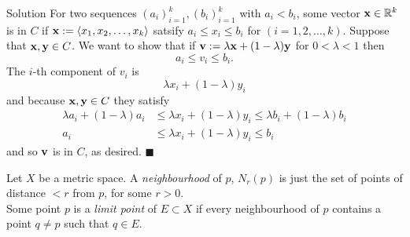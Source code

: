 \documentclass{article}
\begin{document}
\begin{solution}{Solution}
For two sequences $(a_i)_{i=1}^k, (b_i)_{i=1}^k$ with $a_i < b_i$, some
vector ${\bf x} \in \mathbb{R}^k$ is in $C$ if
${\bf x} := \langle x_1, x_2, \ldots, x_k \rangle$ satsify
$a_i \leq x_i \leq b_i$ for $(i=1,2,\ldots, k)$. Suppose that
${\bf x,y} \in C$. We want to show that if ${\bf v} := \lambda {\bf x} +
(1-\lambda) {\bf y}$ for $0 < \lambda < 1$ then
$$
a_i \leq v_i \leq b_i.
$$
The $i$-th component of $v_i$ is
$$
\lambda x_i + (1-\lambda)y_i
$$
and because ${\bf x,y} \in C$ they satisfy
\[
\begin{aligned}
\lambda a_i + (1-\lambda) a_i &\leq \lambda x_i + (1-\lambda)y_i
\leq \lambda b_i + (1-\lambda) b_i \\
a_i &\leq \lambda x_i + (1-\lambda) y_i \leq b_i
\end{aligned}
\]
and so ${\bf v}$ is in $C$, as desired. $\blacksquare$
\end{solution}

Let $X$ be a metric space. A \textit{neighbourhood} of $p$, $N_r(p)$ is
just the set of points of distance $< r$ from $p$, for some $r > 0$. \\

Some point $p$ is a \textit{limit point} of $E \subset X$ if every
neighbourhood of $p$ contains a point $q \neq p$ such that $q \in E$.
\end{document}
